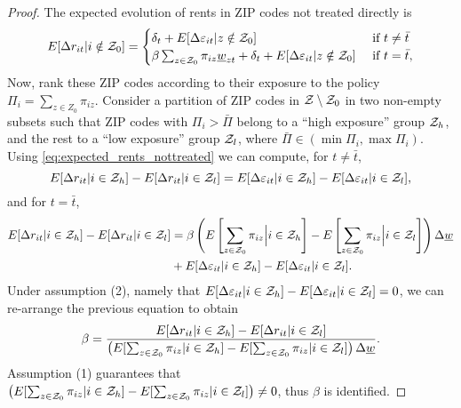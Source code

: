 \begin{proof}
    The expected evolution of rents in ZIP codes not treated directly is
    \begin{equation}\label{eq:expected_rents_nottreated}
        E[\Delta r_{it} | i\notin\mathcal{Z}_0] = 
        \begin{cases}
            \delta_t + E[\Delta \varepsilon_{it} | z\notin\mathcal{Z}_0] 
                                       & \text{ if } t\neq\bar{t} \\
            \beta\sum_{z\in\mathcal{Z}_0}\pi_{iz}\underline{w}_{zt} + \delta_t 
                     + E[\Delta \varepsilon_{it} | z\notin\mathcal{Z}_0] 
                                       & \text{ if } t=\bar{t} ,
        \end{cases}
    \end{equation}
    Now, rank these ZIP codes according to their exposure to the policy 
    $\Pi_i = \sum_{z\in Z_0} \pi_{iz}$.
    Consider a partition of ZIP codes in $\mathcal{Z}\setminus\mathcal{Z}_0$ in 
    two non-empty subsets such that 
    ZIP codes with $\Pi_i > \bar\Pi$ belong to a ``high exposure'' group $\mathcal{Z}_h$, 
    and the rest to a ``low exposure'' group $\mathcal{Z}_l$,
    where $\bar\Pi\in\left(\min{\Pi_i}, \max{\Pi_i}\right)$.
    Using \eqref{eq:expected_rents_nottreated} we can compute, for $t\neq \bar{t}$,
    \begin{equation*}
        E[\Delta r_{it} | i\in\mathcal{Z}_h] - E[\Delta r_{it} | i\in\mathcal{Z}_l] = 
        E[\Delta \varepsilon_{it} | i\in\mathcal{Z}_h] - E[\Delta \varepsilon_{it} | i\in\mathcal{Z}_l] ,
    \end{equation*}
    and for $t = \bar{t}$,
    \begin{equation*}
        \begin{split}
            E[\Delta r_{it} | i\in\mathcal{Z}_h] - E[\Delta r_{it} | i\in\mathcal{Z}_l] 
            & = \beta \left(E\left[\sum_{z\in\mathcal{Z}_0}\pi_{iz} \Big| i\in\mathcal{Z}_h\right]
                           - E\left[\sum_{z\in\mathcal{Z}_0}\pi_{iz} \Big| i\in\mathcal{Z}_l\right]\right) \Delta \underline{w}  \\
            & + E[\Delta \varepsilon_{it} | i\in\mathcal{Z}_h] - E[\Delta \varepsilon_{it} | i\in\mathcal{Z}_l] .
        \end{split}
    \end{equation*}
    Under assumption (2), namely that 
    $E[\Delta \varepsilon_{it} | i\in\mathcal{Z}_h] 
     - E[\Delta \varepsilon_{it} | i\in\mathcal{Z}_l] = 0$,
    we can re-arrange the previous equation to obtain
    \begin{equation}\label{eq:id_beta}
        \beta = \frac{E[\Delta r_{it} | i\in\mathcal{Z}_h] - E[\Delta r_{it} | i\in\mathcal{Z}_l]}
                     {\left(E[\sum_{z\in\mathcal{Z}_0}\pi_{iz} | i\in\mathcal{Z}_h] - E[\sum_{z\in\mathcal{Z}_0}\pi_{iz} | i\in\mathcal{Z}_l]\right) \Delta \underline{w}}.
    \end{equation}
    Assumption (1) guarantees that 
    $\left(E[\sum_{z\in\mathcal{Z}_0}\pi_{iz} | i\in\mathcal{Z}_h] 
          - E[\sum_{z\in\mathcal{Z}_0}\pi_{iz} | i\in\mathcal{Z}_l]\right) \neq 0$,  
    thus $\beta$ is identified.


\end{proof}
